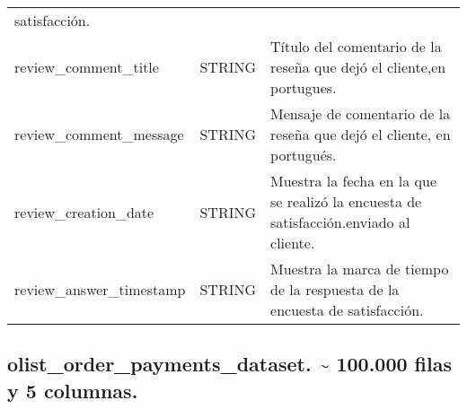 \documentclass[11pt]{article}
\begin{document}
\begin{longtable}[]{@{}lll@{}}
\begin{minipage}[t]{0.30\columnwidth}
satisfacción.\strut
\end{minipage}\tabularnewline
\begin{minipage}[t]{0.30\columnwidth}\raggedright
review\_comment\_title\strut
\end{minipage} & \begin{minipage}[t]{0.30\columnwidth}\raggedright
STRING\strut
\end{minipage} & \begin{minipage}[t]{0.30\columnwidth}\raggedright
Título del comentario de la reseña que dejó el cliente,en
portugues.\strut
\end{minipage}\tabularnewline
\begin{minipage}[t]{0.30\columnwidth}\raggedright
review\_comment\_message\strut
\end{minipage} & \begin{minipage}[t]{0.30\columnwidth}\raggedright
STRING\strut
\end{minipage} & \begin{minipage}[t]{0.30\columnwidth}\raggedright
Mensaje de comentario de la reseña que dejó el cliente, en
portugués.\strut
\end{minipage}\tabularnewline
\begin{minipage}[t]{0.30\columnwidth}\raggedright
review\_creation\_date\strut
\end{minipage} & \begin{minipage}[t]{0.30\columnwidth}\raggedright
STRING\strut
\end{minipage} & \begin{minipage}[t]{0.30\columnwidth}\raggedright
Muestra la fecha en la que se realizó la encuesta de
satisfacción.enviado al cliente.\strut
\end{minipage}\tabularnewline
\begin{minipage}[t]{0.30\columnwidth}\raggedright
review\_answer\_timestamp\strut
\end{minipage} & \begin{minipage}[t]{0.30\columnwidth}\raggedright
STRING\strut
\end{minipage} & \begin{minipage}[t]{0.30\columnwidth}\raggedright
Muestra la marca de tiempo de la respuesta de la encuesta de
satisfacción.\strut
\end{minipage}\tabularnewline
\bottomrule
\end{longtable}

    \hypertarget{olist_order_payments_dataset.-100.000-filas-y-5-columnas.}{%
\subsection{olist\_order\_payments\_dataset. \textasciitilde{} 100.000
filas y 5
columnas.}\label{olist_order_payments_dataset.-100.000-filas-y-5-columnas.}}
\end{document}
